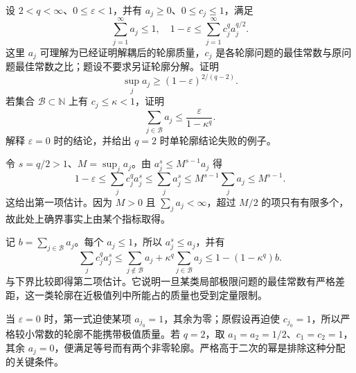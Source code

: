 \begin{exercise}\label{b2:ex:app-F-8}
设 \(2<q<\infty\)、\(0\le\varepsilon<1\)，并有 \(a_j\ge0\)、\(0\le c_j\le1\)，满足
\[
 \sum_{j=1}^{\infty}a_j\le1,
 \quad 1-\varepsilon\le\sum_{j=1}^{\infty}c_j^q a_j^{q/2}.
\]
这里 \(a_j\) 可理解为已经证明解耦后的轮廓质量，\(c_j\) 是各轮廓问题的最佳常数与原问题最佳常数之比；题设不要求另证轮廓分解。证明
\[
 \sup_j a_j\ge(1-\varepsilon)^{2/(q-2)}.
\]
若集合 \(\mathcal B\subset\mathbb N\) 上有 \(c_j\le\kappa<1\)，证明
\[
 \sum_{j\in\mathcal B}a_j\le\frac{\varepsilon}{1-\kappa^q}.
\]
解释 \(\varepsilon=0\) 时的结论，并给出 \(q=2\) 时单轮廓结论失败的例子。
\end{exercise}
\begin{solution}
令 \(s=q/2>1\)、\(M=\sup_j a_j\)。由 \(a_j^s\le M^{s-1}a_j\) 得
\[
 1-\varepsilon
 \le\sum_j c_j^q a_j^s
 \le\sum_j a_j^s
 \le M^{s-1}\sum_j a_j
 \le M^{s-1}.
\]
这给出第一项估计。因为 \(M>0\) 且 \(\sum_j a_j<\infty\)，超过 \(M/2\) 的项只有有限多个，故此处上确界事实上由某个指标取得。

记 \(b=\sum_{j\in\mathcal B}a_j\)。每个 \(a_j\le1\)，所以 \(a_j^s\le a_j\)，并有
\[
 \sum_j c_j^q a_j^s
 \le\sum_{j\notin\mathcal B}a_j+\kappa^q\sum_{j\in\mathcal B}a_j
 \le1-(1-\kappa^q)b.
\]
与下界比较即得第二项估计。它说明一旦某类局部极限问题的最佳常数有严格差距，这一类轮廓在近极值列中所能占的质量也受到定量限制。

当 \(\varepsilon=0\) 时，第一式迫使某项 \(a_{j_0}=1\)，其余为零；原假设再迫使 \(c_{j_0}=1\)，所以严格较小常数的轮廓不能携带极值质量。若 \(q=2\)，取 \(a_1=a_2=1/2\)、\(c_1=c_2=1\)，其余 \(a_j=0\)，便满足等号而有两个非零轮廓。严格高于二次的幂是排除这种分配的关键条件。
\end{solution}

